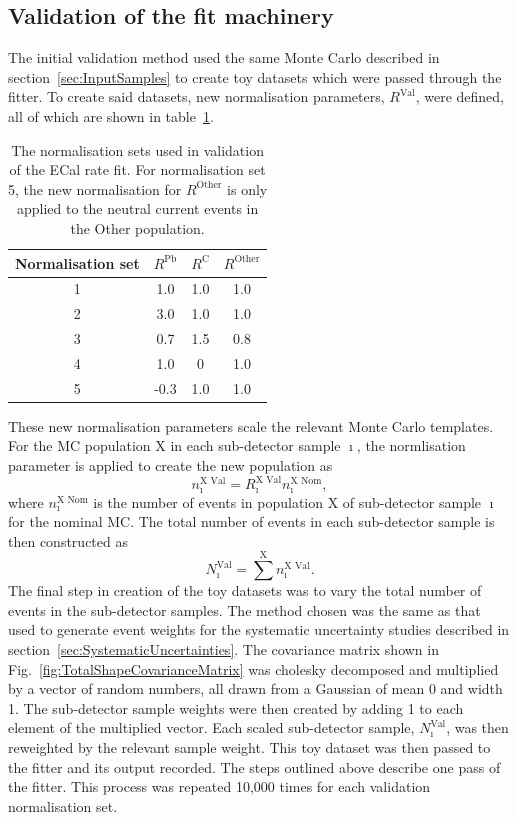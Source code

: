 \subsection{Validation of the fit machinery}
\label{subsec:FitMachineryValidation}
The initial validation method used the same Monte Carlo described in section~\ref{sec:InputSamples} to create toy datasets which were passed through the fitter.  To create said datasets, new normalisation parameters, $R^{\textrm{Val}}$, were defined, all of which are shown in table~\ref{table:ValidationNormalizationSets}.  
\begin{table}
  \begin{tabular}{c | c c c }
    Normalisation set & $R^{\textrm{Pb}}$ & $R^{\textrm{C}}$ & $R^{\textrm{Other}}$\\ \hline \hline
    1 & 1.0 & 1.0 & 1.0 \\
    2 & 3.0 & 1.0 & 1.0 \\
    3 & 0.7 & 1.5 & 0.8 \\
    4 & 1.0 & 0 & 1.0 \\
    5 & -0.3 & 1.0 & 1.0 \\
  \end{tabular}
  \caption{The normalisation sets used in validation of the ECal rate fit.  For normalisation set 5, the new normalisation for $R^{\textrm{Other}}$ is only applied to the neutral current events in the Other population.}
  \label{table:ValidationNormalizationSets}
\end{table}
These new normalisation parameters scale the relevant Monte Carlo templates.  For the MC population $\textrm{X}$ in each sub-detector sample $\imath$, the normlisation parameter is applied to create the new population as
\begin{equation}
n^{\textrm{X Val}}_{\imath} = R^{\textrm{X Val}}_{\imath} n^{\textrm{X Nom}}_{\imath},
\label{eq:ValidationScaledPopulation}
\end{equation}
where $n^{\textrm{X Nom}}_{\imath}$ is the number of events in population $\textrm{X}$ of sub-detector sample $\imath$ for the nominal MC.  The total number of events in each sub-detector sample is then constructed as 
\begin{equation}
N^{\textrm{Val}}_{\imath} = \sum^{\textrm{X}} n^{\textrm{X Val}}_{\imath}.
\label{eq:ValidationNEventsDetector}
\end{equation}
The final step in creation of the toy datasets was to vary the total number of events in the sub-detector samples.  The method chosen was the same as that used to generate event weights for the systematic uncertainty studies described in section~\ref{sec:SystematicUncertainties}.  The covariance matrix shown in Fig.~\ref{fig:TotalShapeCovarianceMatrix} was cholesky decomposed and multiplied by a vector of random numbers, all drawn from a Gaussian of mean 0 and width 1.  The sub-detector sample weights were then created by adding 1 to each element of the multiplied vector.  Each scaled sub-detector sample, $N^{\textrm{Val}}_{\imath}$, was then reweighted by the relevant sample weight.  This toy dataset was then passed to the fitter and its output recorded.  The steps outlined above describe one pass of the fitter.  This process was repeated 10,000 times for each validation normalisation set.
